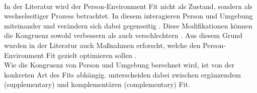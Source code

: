 \\
In der Literatur wird der Person-Environment Fit nicht als Zustand, sondern als wechselseitiger Prozess betrachtet. In diesem interagieren Person und Umgebung miteinander und verändern sich dabei gegenseitig \cite[S. 21f.]{roberts:2006}. Diese Modifikationen können die Kongruenz sowohl verbessern als auch verschlechtern \cite[S. 4]{caplan:1987}. Aus diesem Grund wurden in der Literatur auch Maßnahmen erforscht, welche den Person-Environment Fit gezielt optimieren sollen \cite[S. 16]{cable:2001}.\\
Wie die Kongruenz von Person und Umgebung berechnet wird, ist von der konkreten Art des Fits abhängig. \textcite[S. 1]{muchinsky:1987} unterscheiden dabei zwischen ergänzendem (supplementary) und komplementären (complementary) Fit. \\

